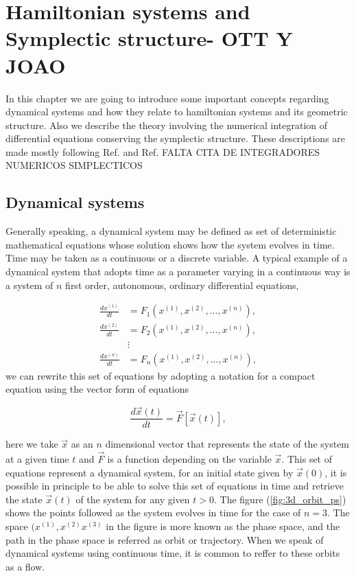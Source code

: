\pagestyle{fancy}
\fancyhf{}
\rhead{\rightmark}
\lhead{\thepage}

\chapter{Hamiltonian systems and Symplectic structure- OTT Y JOAO}
In this chapter we are going to introduce some important concepts regarding dynamical systems and how they relate to hamiltonian systems and its geometric structure. Also we describe the theory involving the numerical integration of differential equations conserving the symplectic structure. These descriptions are made mostly following Ref. \cite{ottChaosDynamicalSystems2002} and Ref. FALTA CITA DE INTEGRADORES NUMERICOS SIMPLECTICOS





\section{Dynamical systems}
Generally speaking, a dynamical system may be defined as set of deterministic mathematical equations whose solution shows how the system evolves in time. Time may be taken as a continuous or a discrete variable. A typical example of a dynamical system that adopts time as a parameter varying in  a continuous way is a system of $n$ first order, autonomous, ordinary differential equations,

\begin{eqnarray} 
\frac{dx^{(1)}}{dt}&=F_1(x^{(1)},x^{(2)},...,x^{(n)}),\nonumber \\
\frac{dx^{(2)}}{dt}&=F_2(x^{(1)},x^{(2)},...,x^{(n)}),\\
&\vdots \nonumber \\
\frac{dx^{(n)}}{dt}&=F_n(x^{(1)},x^{(2)},...,x^{(n)}),
\nonumber
\label{eq:set_diff_eqs}
\end{eqnarray} 
we can rewrite this set of equations by adopting a notation for a compact equation using the vector form of equations

\begin{equation}
\frac{d\vec{x}(t)}{dt}=\vec{F}[\vec{x}(t)],
\label{eq_:vect_diff_eqs}
\end{equation}

here we take $\vec{x}$ as an $n$ dimensional vector that represents the state of the system at a given time $t$ and $\vec{F}$ is a function depending on the variable $\vec{x}$. This set of equations represent a dynamical system, for an initial state given by $\vec{x}(0)$, it is possible in principle to be able to solve this set of equations in time and retrieve the state $\vec{x}(t)$ of the system for any given $t>0$. The figure (\ref{fig:3d_orbit_ps}) shows the points followed as the system evolves in time for the case of $n=3$. The space $(x^{(1)},x^{(2)}x^{(3)}$ in the figure is more known as the phase space, and the path in the phase space is referred as orbit or trajectory. When we speak of dynamical systems using continuous time, it is common to reffer to these orbits as a flow.

